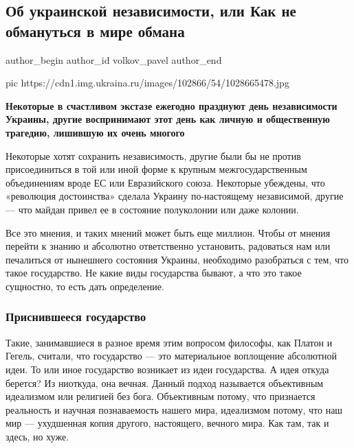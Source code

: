  
 
 
 
 
 
\subsection{Об украинской независимости, или Как не обмануться в мире обмана}
\label{sec:13_12_2020.news.ru.ukraina_ru.volkov_pavel.1.ob_ukrainskoi_nezavisimosti}
\ifcmt
	author_begin
   author_id volkov_pavel
	author_end
\fi

\ifcmt
pic https://cdn1.img.ukraina.ru/images/102866/54/1028665478.jpg
\fi

\textbf{Некоторые в счастливом экстазе ежегодно празднуют день независимости Украины,
другие воспринимают этот день как личную и общественную трагедию, лишившую их
очень многого}

Некоторые хотят сохранить независимость, другие были бы не против
присоединиться в той или иной форме к крупным межгосударственным объединениям
вроде ЕС или Евразийского союза. Некоторые убеждены, что «революция
достоинства» сделала Украину по-настоящему независимой, другие — что майдан
привел ее в состояние полуколонии или даже колонии.

Все это мнения, и таких мнений может быть еще миллион. Чтобы от мнения перейти
к знанию и абсолютно ответственно установить, радоваться нам или печалиться от
нынешнего состояния Украины, необходимо разобраться с тем, что такое
государство. Не какие виды государства бывают, а что это такое сущностно, то
есть дать определение.

\subsubsection{Приснившееся государство}

Такие, занимавшиеся в разное время этим вопросом философы, как Платон и Гегель,
считали, что государство — это материальное воплощение абсолютной идеи. То или
иное государство возникает из идеи государства. А идея откуда берется? Из
ниоткуда, она вечная. Данный подход называется объективным идеализмом или
религией без бога. Объективным потому, что признается реальность и научная
познаваемость нашего мира, идеализмом потому, что наш мир — ухудшенная копия
другого, настоящего, вечного мира. Как там, так и здесь, но хуже.


